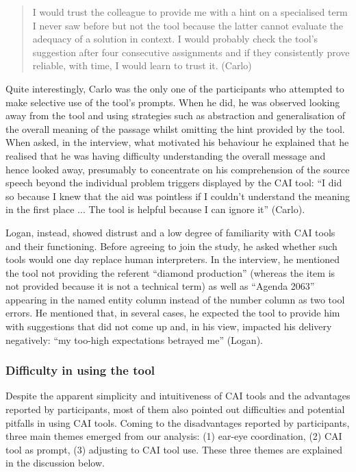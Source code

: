 \begin{quote}
    I would trust the colleague to provide me with a hint on a specialised term I never saw before but not the tool because the latter cannot evaluate the adequacy of a solution in context. I would probably check the tool’s suggestion after four consecutive assignments and if they consistently prove reliable, with time, I would learn to trust it. (Carlo)
\end{quote}
Quite interestingly, Carlo was the only one of the participants who attempted to make selective use of the tool’s prompts. When he did, he was observed looking away from the tool and using strategies such as abstraction and generalisation of the overall meaning of the passage whilst omitting the hint provided by the tool. When asked, in the interview, what motivated his behaviour he explained that he realised that he was having difficulty understanding the overall message and hence looked away, presumably to concentrate on his comprehension of the source speech beyond the individual problem triggers displayed by the CAI tool: ``I did so because I knew that the aid was pointless if I couldn’t understand the meaning in the first place ... The tool is helpful because I can ignore it'' (Carlo).

Logan, instead, showed distrust and a low degree of familiarity with CAI tools and their functioning. Before agreeing to join the study, he asked whether such tools would one day replace human interpreters. In the interview, he mentioned the tool not providing the referent “diamond production” (whereas the item is not provided because it is not a technical term) as well as “Agenda 2063” appearing in the named entity column instead of the number column as two tool errors. He mentioned that, in several cases, he expected the tool to provide him with suggestions that did not come up and, in his view, impacted his delivery negatively: ``my too-high expectations betrayed me'' (Logan).


\subsubsection{Difficulty in using the tool}

Despite the apparent simplicity and intuitiveness of CAI tools and the advantages reported by participants, most of them also pointed out difficulties and potential pitfalls in using CAI tools. Coming to the disadvantages reported by participants, three main themes emerged from our analysis: (1) ear-eye coordination, (2) CAI tool as prompt, (3) adjusting to CAI tool use. These three themes are explained in the discussion below.

